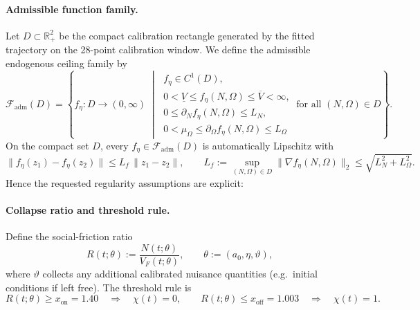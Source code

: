 \documentclass[11pt]{article}
\begin{document}
\paragraph{Admissible function family.}
Let \(D\subset \mathbb{R}_{+}^{2}\) be the compact calibration rectangle generated by the fitted
trajectory on the 28-point calibration window. We define the admissible endogenous ceiling family by
\begin{equation}
\mathcal F_{\mathrm{adm}}(D)=
\left\{
f_\eta:D\to (0,\infty)\; \middle|\;
\begin{array}{l}
f_\eta\in C^1(D),\\[2pt]
0<\underline V\le f_\eta(N,\Omega)\le \overline V<\infty,\\[2pt]
0\le \partial_N f_\eta(N,\Omega)\le L_N,\\[2pt]
0<\mu_\Omega\le \partial_\Omega f_\eta(N,\Omega)\le L_\Omega
\end{array}
\ \text{for all }(N,\Omega)\in D
\right\}.
\label{eq:S1_Fadm}
\end{equation}
On the compact set \(D\), every \(f_\eta\in \mathcal F_{\mathrm{adm}}(D)\) is automatically Lipschitz
with
\begin{equation}
\|f_\eta(z_1)-f_\eta(z_2)\|
\le
L_f\,\|z_1-z_2\|,
\qquad
L_f:=\sup_{(N,\Omega)\in D}\|\nabla f_\eta(N,\Omega)\|_2
\le \sqrt{L_N^2+L_\Omega^2}.
\label{eq:S1_Lipschitz}
\end{equation}
Hence the requested regularity assumptions are explicit:

\paragraph{Collapse ratio and threshold rule.}
Define the social-friction ratio
\begin{equation}
R(t;\theta):=\frac{N(t;\theta)}{V_F(t;\theta)},
\qquad
\theta:=(a_0,\eta,\vartheta),
\label{eq:S1_ratio}
\end{equation}
where \(\vartheta\) collects any additional calibrated nuisance quantities (e.g.\ initial conditions
if left free). The threshold rule is
\begin{equation}
R(t;\theta)\ge x_{\mathrm{on}}=1.40
\quad\Longrightarrow\quad
\chi(t)=0,
\qquad
R(t;\theta)\le x_{\mathrm{off}}=1.003
\quad\Longrightarrow\quad
\chi(t)=1.
\label{eq:S1_thresholds}
\end{equation}
\end{document}
